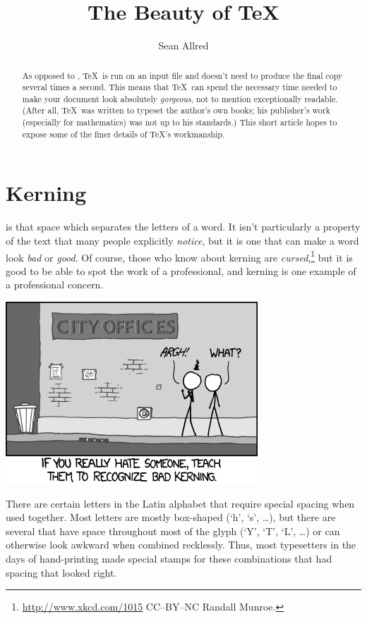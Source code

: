 \documentclass{article}
\title{The Beauty of \TeX}
\author{Sean Allred}
\begin{document}
\maketitle

\begin{abstract}
As opposed to \MicrosoftWord,
  \TeX\ is run on an input file and
  doesn't need to produce the final copy
  several times a second.
This means that \TeX\ can spend
  the necessary time needed
  to make your document
  look absolutely \emph{gorgeous},
  not to mention exceptionally readable.
(After all, \TeX\ was written to typeset the author's own books;
 his publisher's work (especially for mathematics) was not up to his standards.)
This short article hopes
  to expose some of the finer details
  of \TeX's workmanship.
\end{abstract}
\vfil
\tableofcontents
\newpage

\section{Kerning}
\label{sec:kerning}

 is that space which separates the letters of a word.
It isn't particularly a property of the text that many people explicitly \emph{notice},
  but it is one that can make a word look \emph{bad} or \emph{good}.
Of course, those who know about kerning are \emph{cursed},\footnote{%
  \url{http://www.xkcd.com/1015} CC--BY--NC Randall Munroe.}
  but it is good to be able to spot the work of a professional,
  and kerning is one example of a professional concern.

\begin{center}
  \includegraphics[width=.5\linewidth]{xkcd-kerning}
\end{center}

\noindent
There are certain letters in the Latin alphabet that
  require special spacing when used together.
Most letters are mostly box-shaped (`h', `s', \dots),
  but there are several that have space
  throughout most of the glyph (`Y', `T', `L', \dots)
  or can otherwise look awkward when combined recklessly.
Thus, most typesetters in the days of hand-printing
  made special stamps for these combinations
  that had spacing that looked right.
\end{document}
